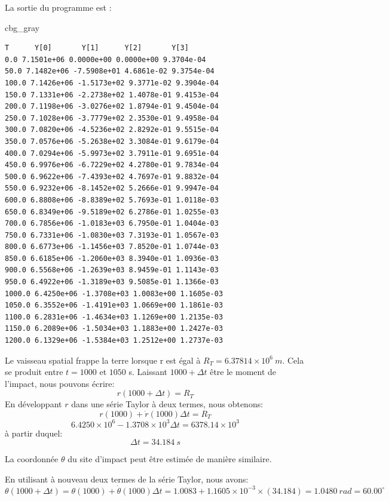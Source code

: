 \documentclass[%
oneside,                 %
final,                   %
10pt,french]{article}
\newenvironment{_cod_tight}[1]{
   \def\FrameCommand{\colorbox{#1}}
   \FrameRule0.6pt\MakeFramed {\FrameRestore}\vskip3mm}
   {\vskip0mm\endMakeFramed}
\newenvironment{cod}[1]{
\bgroup\rmfamily
\fboxsep=0mm\relax
\begin{_cod_tight}{#1}
\list{}{\parsep=-2mm\parskip=0mm\topsep=0pt\leftmargin=2mm
\rightmargin=2\leftmargin\leftmargin=4pt\relax}
\item\relax}
{\endlist\end{_cod_tight}\egroup}
\newenvironment{doconceexercise}{}{}
\begin{document}
\begin{doconceexercise}
La sortie du programme est :
\begin{cod}{cbg_gray}\begin{verbatim}
T      Y[0]       Y[1]      Y[2]       Y[3]
0.0 7.1501e+06 0.0000e+00 0.0000e+00 9.3704e-04
50.0 7.1482e+06 -7.5908e+01 4.6861e-02 9.3754e-04
100.0 7.1426e+06 -1.5173e+02 9.3771e-02 9.3904e-04
150.0 7.1331e+06 -2.2738e+02 1.4078e-01 9.4153e-04
200.0 7.1198e+06 -3.0276e+02 1.8794e-01 9.4504e-04
250.0 7.1028e+06 -3.7779e+02 2.3530e-01 9.4958e-04
300.0 7.0820e+06 -4.5236e+02 2.8292e-01 9.5515e-04
350.0 7.0576e+06 -5.2638e+02 3.3084e-01 9.6179e-04
400.0 7.0294e+06 -5.9973e+02 3.7911e-01 9.6951e-04
450.0 6.9976e+06 -6.7229e+02 4.2780e-01 9.7834e-04
500.0 6.9622e+06 -7.4393e+02 4.7697e-01 9.8832e-04
550.0 6.9232e+06 -8.1452e+02 5.2666e-01 9.9947e-04
600.0 6.8808e+06 -8.8389e+02 5.7693e-01 1.0118e-03
650.0 6.8349e+06 -9.5189e+02 6.2786e-01 1.0255e-03
700.0 6.7856e+06 -1.0183e+03 6.7950e-01 1.0404e-03
750.0 6.7331e+06 -1.0830e+03 7.3193e-01 1.0567e-03
800.0 6.6773e+06 -1.1456e+03 7.8520e-01 1.0744e-03
850.0 6.6185e+06 -1.2060e+03 8.3940e-01 1.0936e-03
900.0 6.5568e+06 -1.2639e+03 8.9459e-01 1.1143e-03
950.0 6.4922e+06 -1.3189e+03 9.5085e-01 1.1366e-03
1000.0 6.4250e+06 -1.3708e+03 1.0083e+00 1.1605e-03
1050.0 6.3552e+06 -1.4191e+03 1.0669e+00 1.1861e-03
1100.0 6.2831e+06 -1.4634e+03 1.1269e+00 1.2135e-03
1150.0 6.2089e+06 -1.5034e+03 1.1883e+00 1.2427e-03
1200.0 6.1329e+06 -1.5384e+03 1.2512e+00 1.2737e-03
\end{verbatim}
\end{cod}
\noindent
Le vaisseau spatial frappe la terre lorsque r est égal à $R_T = 6.37814 \times 10^6 \ m$. Cela se produit entre $t = 1000$ et $1050$ s.
Laissant $1000 + \Delta t$ être le moment de l'impact, nous pouvons écrire:
$$r(1000 + \Delta t ) = R_T$$
En développant $r$ dans une série Taylor à deux termes, nous obtenons:
$$r(1000) + \dot{r}(1000) \Delta t = R_T$$
$$6.4250 \times 10^6 - 1.3708 \times 10^3 \Delta t = 6378.14 \times 10^3 $$
à partir duquel:
$$\Delta t= 34.184 \ s$$

La coordonnée $\theta$ du site d'impact peut être estimée de manière similaire.

En utilisant à nouveau deux termes de la série Taylor, nous avons:
$$\theta (1000 + \Delta t ) = \theta (1000) + \dot{\theta} (1000) \Delta t = 1.0083 + 1.1605 \times 10^{-3} \times (34.184) = 1.0480 \ rad = 60.00^\circ$$




\end{doconceexercise}
\end{document}
